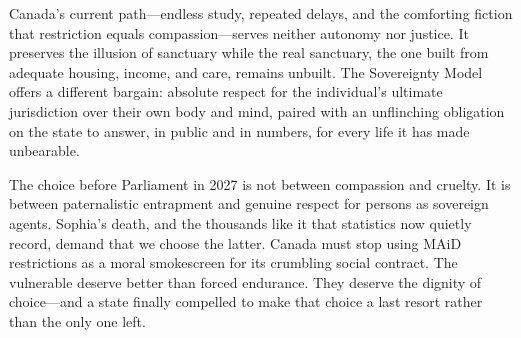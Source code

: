 \documentclass[11pt, letterpaper]{article}
\begin{document}
Canada's current path---endless study, repeated delays, and the comforting fiction that restriction equals compassion---serves neither autonomy nor justice. It preserves the illusion of sanctuary while the real sanctuary, the one built from adequate housing, income, and care, remains unbuilt. The Sovereignty Model offers a different bargain: absolute respect for the individual's ultimate jurisdiction over their own body and mind, paired with an unflinching obligation on the state to answer, in public and in numbers, for every life it has made unbearable.

The choice before Parliament in 2027 is not between compassion and cruelty. It is between paternalistic entrapment and genuine respect for persons as sovereign agents. Sophia's death, and the thousands like it that statistics now quietly record, demand that we choose the latter. Canada must stop using MAiD restrictions as a moral smokescreen for its crumbling social contract. The vulnerable deserve better than forced endurance. They deserve the dignity of choice---and a state finally compelled to make that choice a last resort rather than the only one left.
\end{document}
